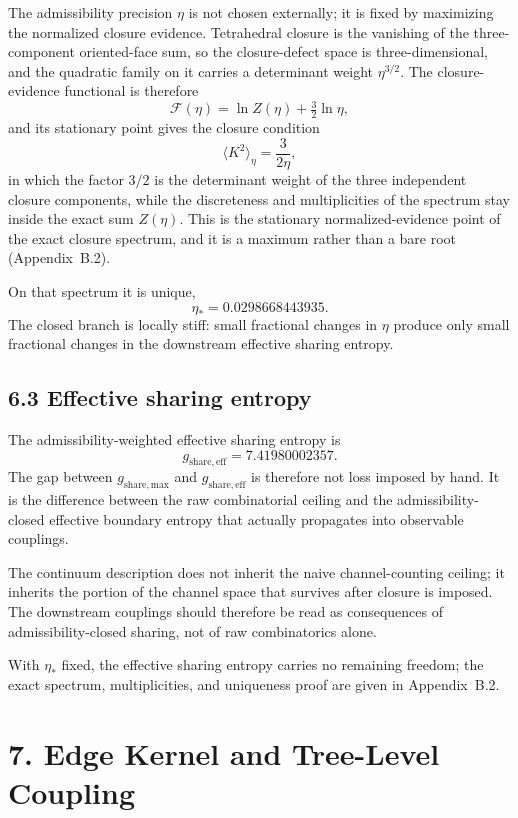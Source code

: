\documentclass[11pt]{article}
\begin{document}
The admissibility precision $\eta$ is not chosen externally; it is fixed by maximizing the normalized closure evidence. Tetrahedral closure is the vanishing of the three-component oriented-face sum, so the closure-defect space is three-dimensional, and the quadratic family on it carries a determinant weight $\eta^{3/2}$. The closure-evidence functional is therefore
\[
\mathcal F(\eta)=\ln Z(\eta)+\tfrac32\ln\eta,
\]
and its stationary point gives the closure condition
\[
\langle K^2\rangle_\eta = \frac{3}{2\eta},
\]
in which the factor $3/2$ is the determinant weight of the three independent closure components, while the discreteness and multiplicities of the spectrum stay inside the exact sum $Z(\eta)$. This is the stationary normalized-evidence point of the exact closure spectrum, and it is a maximum rather than a bare root (Appendix~B.2).

On that spectrum it is unique,
\[
\eta_* = 0.0298668443935.
\]
The closed branch is locally stiff: small fractional changes in $\eta$ produce only small fractional changes in the downstream effective sharing entropy.

\subsection{6.3 Effective sharing entropy}

The admissibility-weighted effective sharing entropy is
\[
g_{\mathrm{share,eff}} = 7.41980002357.
\]
The gap between $g_{\mathrm{share,max}}$ and $g_{\mathrm{share,eff}}$ is therefore not loss imposed by hand. It is the difference between the raw combinatorial ceiling and the admissibility-closed effective boundary entropy that actually propagates into observable couplings.

The continuum description does not inherit the naive channel-counting ceiling; it inherits the portion of the channel space that survives after closure is imposed. The downstream couplings should therefore be read as consequences of admissibility-closed sharing, not of raw combinatorics alone.

With $\eta_*$ fixed, the effective sharing entropy carries no remaining freedom; the exact spectrum, multiplicities, and uniqueness proof are given in Appendix~B.2.

\section{7. Edge Kernel and Tree-Level Coupling}
\end{document}
